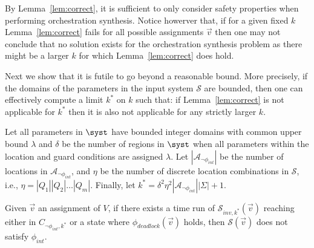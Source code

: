 \newcommand{\mk}{k^*}
By Lemma~\ref{lem:correct}, it is sufficient to only consider safety
properties when performing orchestration synthesis.
Notice howerver that,  if for a given fixed $k$ Lemma~\ref{lem:correct} fails for all possible
assignments $\vec{v}$ then one may not conclude that no solution exists for
the orchestration synthesis problem as there might be a larger $k$ for
which Lemma~\ref{lem:correct} does hold.



Next we show that it is futile to go beyond a reasonable bound. More precisely, if the domains of the parameters in the input system $\mathcal{S}$ are bounded, then one can effectively compute a limit $\mk$ on $k$ such that: if Lemma~\ref{lem:correct} is not applicable for $\mk$ then it is also not applicable for any strictly larger $k$\@. 













\begin{lemma}\label{lem:k}
Let all parameters in $\syst$ have bounded integer domains with common
upper bound $\lambda$ and $\delta$ be the number of regions in $\syst$
when all parameters within the location and guard conditions are
assigned $\lambda$. Let $|\mathcal{A}_{\neg\phi_{int}}|$ be the number
of locations in $\mathcal{A}_{\neg\phi_{int}}$, and $\eta$ be the
number of discrete location combinations in $\mathcal{S}$, i.e., $\eta
= |Q_1||Q_2|\dots|Q_m|$. Finally, let $\mk =
\delta^2\eta^2|\mathcal{A}_{\neg\phi_{int}}||\Sigma|+1$.

Given $\vec{v}$ an
assignment of $V$, if there exists a time run of
$\mathcal{S}_{inv,\mk}(\vec{v})$ reaching either  in
$C_{\neg\phi_{int},\mk}$ or a state where $\phi_{deadlock}(\vec{v})$
holds, then $\mathcal{S}(\vec{v})$ does not satisfy $\phi_{int}$.







	
\end{lemma}

